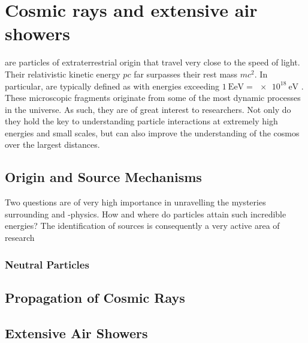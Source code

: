 
\chapter{Cosmic rays and extensive air showers}
\label{chap:cosmic-rays}

\CRs are particles of extraterrestrial origin that travel very close to the 
speed of light. Their relativistic kinetic energy $pc$ far surpasses their rest 
mass $mc^2$. In particular, \UHECRs are typically defined as \CRs with energies
exceeding $\SI{1}{\exa\eV} = \SI{e18}{\eV}$ \cite{alves_batista_open_2019}. 
These microscopic fragments originate from some of the most dynamic processes 
in the universe. As such, they are of great interest to researchers. Not only do
they hold the key to understanding particle interactions at extremely high 
energies and small scales, but can also improve the understanding of the cosmos 
over the largest distances.

\section{Origin and Source Mechanisms}
\label{sec:cr-accelerators}

Two questions are of very high importance in unravelling the mysteries 
surrounding \CRs and \UHE-physics. How and where do particles attain such 
incredible energies? The identification of \CR sources is consequently a very 
active area of research

\subsection{Neutral Particles}
\label{ssec:neutral-particles}



\section{Propagation of Cosmic Rays}
\label{sec:cr-propagation}



\section{Extensive Air Showers}
\label{sec:extensive-air-showers}



